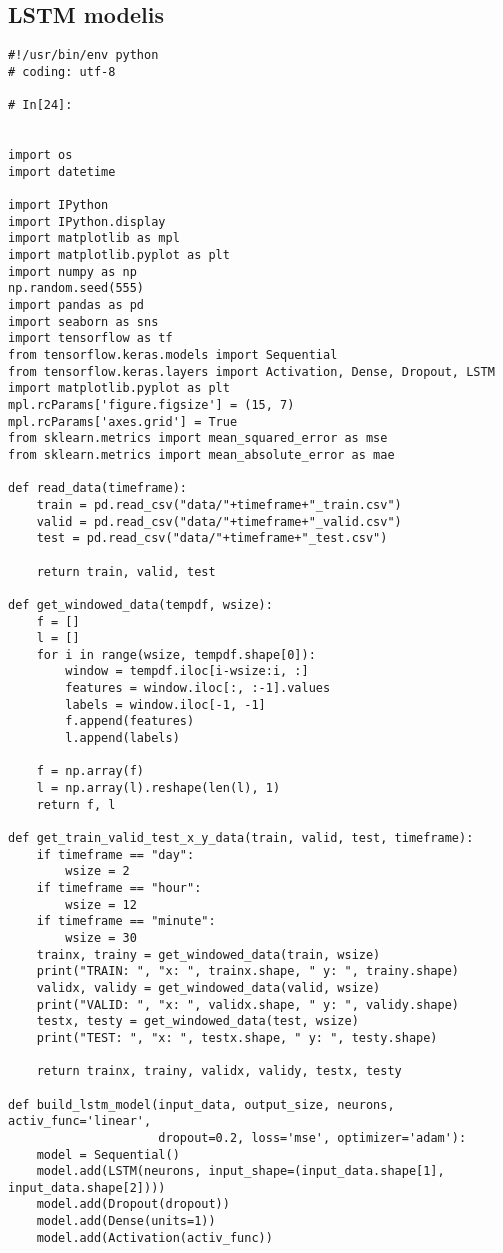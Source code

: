 \documentclass[12pt,a4paper]{article}
\begin{document}
\subsection{LSTM modelis}
\begin{lstlisting}[breaklines]
#!/usr/bin/env python
# coding: utf-8

# In[24]:


import os
import datetime

import IPython
import IPython.display
import matplotlib as mpl
import matplotlib.pyplot as plt
import numpy as np
np.random.seed(555)
import pandas as pd
import seaborn as sns
import tensorflow as tf
from tensorflow.keras.models import Sequential
from tensorflow.keras.layers import Activation, Dense, Dropout, LSTM
import matplotlib.pyplot as plt
mpl.rcParams['figure.figsize'] = (15, 7)
mpl.rcParams['axes.grid'] = True
from sklearn.metrics import mean_squared_error as mse
from sklearn.metrics import mean_absolute_error as mae

def read_data(timeframe):
    train = pd.read_csv("data/"+timeframe+"_train.csv")
    valid = pd.read_csv("data/"+timeframe+"_valid.csv")
    test = pd.read_csv("data/"+timeframe+"_test.csv")
    
    return train, valid, test

def get_windowed_data(tempdf, wsize):
    f = []
    l = []
    for i in range(wsize, tempdf.shape[0]):
        window = tempdf.iloc[i-wsize:i, :]
        features = window.iloc[:, :-1].values
        labels = window.iloc[-1, -1]
        f.append(features)
        l.append(labels)

    f = np.array(f)
    l = np.array(l).reshape(len(l), 1)
    return f, l

def get_train_valid_test_x_y_data(train, valid, test, timeframe):
    if timeframe == "day":
        wsize = 2
    if timeframe == "hour":
        wsize = 12
    if timeframe == "minute":
        wsize = 30
    trainx, trainy = get_windowed_data(train, wsize)
    print("TRAIN: ", "x: ", trainx.shape, " y: ", trainy.shape)
    validx, validy = get_windowed_data(valid, wsize)
    print("VALID: ", "x: ", validx.shape, " y: ", validy.shape)
    testx, testy = get_windowed_data(test, wsize)
    print("TEST: ", "x: ", testx.shape, " y: ", testy.shape)
    
    return trainx, trainy, validx, validy, testx, testy

def build_lstm_model(input_data, output_size, neurons, activ_func='linear',
                     dropout=0.2, loss='mse', optimizer='adam'):
    model = Sequential()
    model.add(LSTM(neurons, input_shape=(input_data.shape[1], input_data.shape[2])))
    model.add(Dropout(dropout))
    model.add(Dense(units=1))
    model.add(Activation(activ_func))


\end{lstlisting}
\end{document}
